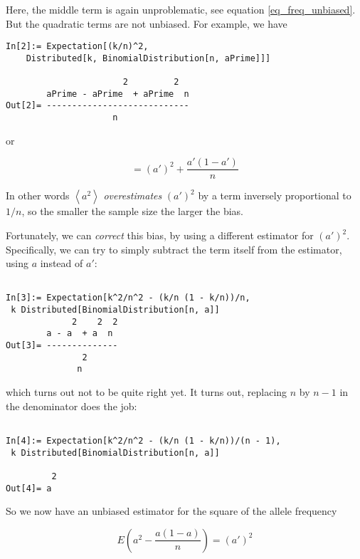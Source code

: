 \documentclass{article}
\begin{document}
Here, the middle term is again unproblematic, see equation \ref{eq_freq_unbiased}. But the quadratic terms are not unbiased. For example, we have

\begin{lstlisting}
In[2]:= Expectation[(k/n)^2,                                                    
    Distributed[k, BinomialDistribution[n, aPrime]]]                            

                       2         2
        aPrime - aPrime  + aPrime  n
Out[2]= ----------------------------
                     n
\end{lstlisting}

or

\begin{equation}
=\left(a'\right)^2+\frac{a'(1-a')}{n}
\end{equation}

In other words \(\left\langle a^2\right\rangle\) \textit{ overestimates }\((a')^2\) by a term inversely proportional to \(1/n\), so the smaller the
sample size the larger the bias.

Fortunately, we can \textit{ correct} this bias, by using a different estimator for \((a')^2\). Specifically, we can try to simply subtract the term itself from the estimator, using \(a\) instead of \(a'\):

\begin{lstlisting}

In[3]:= Expectation[k^2/n^2 - (k/n (1 - k/n))/n,
 k Distributed[BinomialDistribution[n, a]]   
             2    2  2
        a - a  + a  n
Out[3]= --------------
               2
              n
\end{lstlisting}

which turns out not to be quite right yet. It turns out, replacing \(n\) by \(n-1\) in the denominator does the job:

\begin{lstlisting}

In[4]:= Expectation[k^2/n^2 - (k/n (1 - k/n))/(n - 1),                          
 k Distributed[BinomialDistribution[n, a]]                                   

         2
Out[4]= a
\end{lstlisting}

So we now have an unbiased estimator for the square of the allele frequency

\begin{equation}
\label{eq_freqSquare_unbiased}
E\left( a^2-\frac{a(1-a)}{n}\right) =\left(a'\right)^2
\end{equation}
\end{document}
